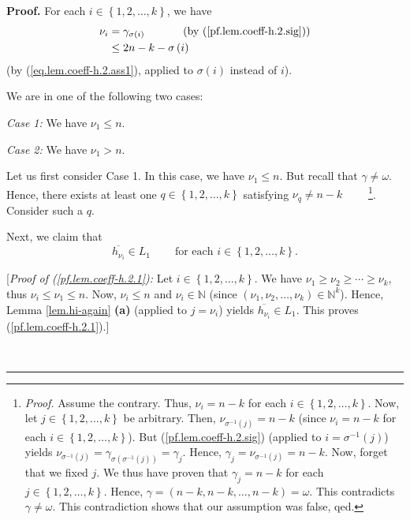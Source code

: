 \documentclass[numbers=enddot,12pt,final,onecolumn,notitlepage]{scrartcl}%
\theoremstyle{definition}
\newenvironment{proof}[1][Proof]{\noindent\textbf{#1.} }{\ \rule{0.5em}{0.5em}}
\begin{document}
\begin{proof}
For each $i\in\left\{  1,2,\ldots,k\right\}  $, we have%
\begin{align}
\nu_{i}  &  =\gamma_{\sigma\left(  i\right)  }\ \ \ \ \ \ \ \ \ \ \left(
\text{by (\ref{pf.lem.coeff-h.2.sig})}\right) \nonumber\\
&  \leq2n-k-\sigma\left(  i\right)  \label{pf.lem.coeff-h.2.ineq}%
\end{align}
(by (\ref{eq.lem.coeff-h.2.ass1}), applied to $\sigma\left(  i\right)  $
instead of $i$).

We are in one of the following two cases:

\textit{Case 1:} We have $\nu_{1}\leq n$.

\textit{Case 2:} We have $\nu_{1}>n$.

Let us first consider Case 1. In this case, we have $\nu_{1}\leq n$. But
recall that $\gamma\neq\omega$. Hence, there exists at least one $q\in\left\{
1,2,\ldots,k\right\}  $ satisfying $\nu_{q}\neq n-k$%
\ \ \ \ \footnote{\textit{Proof.} Assume the contrary. Thus, $\nu_{i}=n-k$ for
each $i\in\left\{  1,2,\ldots,k\right\}  $. Now, let $j\in\left\{
1,2,\ldots,k\right\}  $ be arbitrary. Then, $\nu_{\sigma^{-1}\left(  j\right)
}=n-k$ (since $\nu_{i}=n-k$ for each $i\in\left\{  1,2,\ldots,k\right\}  $).
But (\ref{pf.lem.coeff-h.2.sig}) (applied to $i=\sigma^{-1}\left(  j\right)
$) yields $\nu_{\sigma^{-1}\left(  j\right)  }=\gamma_{\sigma\left(
\sigma^{-1}\left(  j\right)  \right)  }=\gamma_{j}$. Hence, $\gamma_{j}%
=\nu_{\sigma^{-1}\left(  j\right)  }=n-k$. Now, forget that we fixed $j$. We
thus have proven that $\gamma_{j}=n-k$ for each $j\in\left\{  1,2,\ldots
,k\right\}  $. Hence, $\gamma=\left(  n-k,n-k,\ldots,n-k\right)  =\omega$.
This contradicts $\gamma\neq\omega$. This contradiction shows that our
assumption was false, qed.}. Consider such a $q$.

Next, we claim that%
\begin{equation}
\overline{h_{\nu_{i}}}\in L_{1}\ \ \ \ \ \ \ \ \ \ \text{for each }%
i\in\left\{  1,2,\ldots,k\right\}  . \label{pf.lem.coeff-h.2.1}%
\end{equation}


[\textit{Proof of (\ref{pf.lem.coeff-h.2.1}):} Let $i\in\left\{
1,2,\ldots,k\right\}  $. We have $\nu_{1}\geq\nu_{2}\geq\cdots\geq\nu_{k}$,
thus $\nu_{i}\leq\nu_{1}\leq n$. Now, $\nu_{i}\leq n$ and $\nu_{i}%
\in\mathbb{N}$ (since $\left(  \nu_{1},\nu_{2},\ldots,\nu_{k}\right)
\in\mathbb{N}^{k}$). Hence, Lemma \ref{lem.hi-again} \textbf{(a)} (applied to
$j=\nu_{i}$) yields $\overline{h_{\nu_{i}}}\in L_{1}$. This proves
(\ref{pf.lem.coeff-h.2.1}).]


\end{proof}
\end{document}
